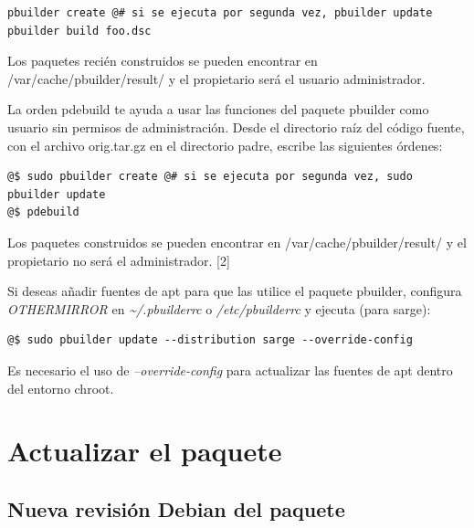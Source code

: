 \documentclass[letterpaper,12pt,spanish]{manual}
\begin{document}
\begin{Verbatim}[commandchars=@\[\]]
pbuilder create @# si se ejecuta por segunda vez, pbuilder update
pbuilder build foo.dsc
\end{Verbatim}

Los paquetes recién construidos se pueden encontrar en /var/cache/pbuilder/result/ y el propietario será el usuario administrador.

La orden pdebuild te ayuda a usar las funciones del paquete pbuilder como usuario sin permisos de administración. Desde el directorio raíz del código fuente, con el archivo orig.tar.gz en el directorio padre, escribe las siguientes órdenes:

\begin{Verbatim}[commandchars=@\[\]]
@$ sudo pbuilder create @# si se ejecuta por segunda vez, sudo pbuilder update
@$ pdebuild
\end{Verbatim}

Los paquetes construidos se pueden encontrar en /var/cache/pbuilder/result/ y el propietario no será el administrador. {[}2{]}

Si deseas añadir fuentes de apt para que las utilice el paquete pbuilder, configura \emph{OTHERMIRROR} en \emph{\textasciitilde{}/.pbuilderrc} o \emph{/etc/pbuilderrc} y ejecuta (para sarge):

\begin{Verbatim}[commandchars=@\[\]]
@$ sudo pbuilder update --distribution sarge --override-config
\end{Verbatim}

Es necesario el uso de \emph{--override-config} para actualizar las fuentes de apt dentro del entorno chroot.


\section{\textbf{Actualizar el paquete}}


\subsection{Nueva revisión Debian del paquete}
\end{document}
